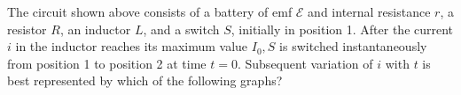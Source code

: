\begin{questions}\setcounter{question}{18}\question
The circuit shown above consists of a battery of emf $\mathcal{E}$ and internal resistance $r$, a resistor $R$, an inductor $L$, and a switch $S$, initially in position 1. After the current $i$ in the inductor reaches its maximum value $I_{0}, S$ is switched instantaneously from position 1 to position 2 at time $t=0$. Subsequent variation of $i$ with $t$ is best represented by which of the following graphs?

\begin{oneparchoices}
\choice {}
\choice {}

\end{oneparchoices}
\end{questions}
